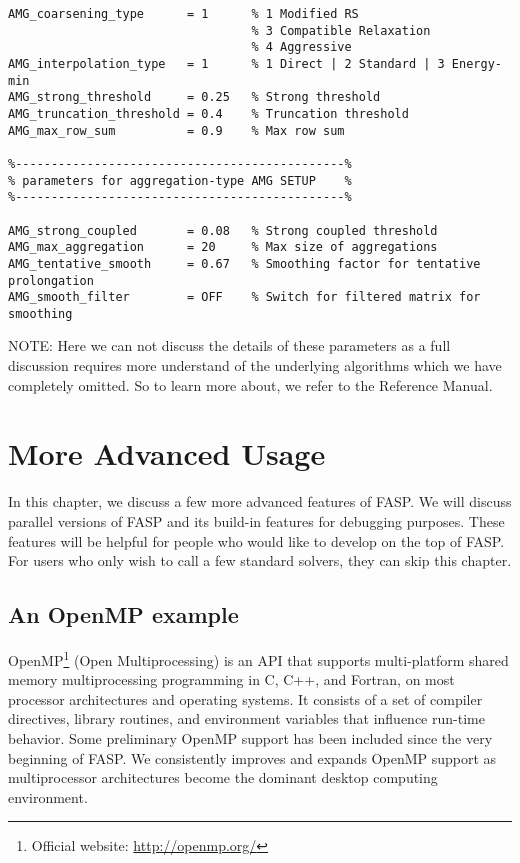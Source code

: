 \documentclass[11pt]{memoir}
\begin{document}
\begin{lstlisting}
AMG_coarsening_type      = 1      % 1 Modified RS
                                  % 3 Compatible Relaxation
                                  % 4 Aggressive 
AMG_interpolation_type   = 1      % 1 Direct | 2 Standard | 3 Energy-min
AMG_strong_threshold     = 0.25   % Strong threshold
AMG_truncation_threshold = 0.4    % Truncation threshold
AMG_max_row_sum          = 0.9    % Max row sum

%----------------------------------------------%
% parameters for aggregation-type AMG SETUP    %
%----------------------------------------------%

AMG_strong_coupled       = 0.08   % Strong coupled threshold
AMG_max_aggregation      = 20     % Max size of aggregations
AMG_tentative_smooth     = 0.67   % Smoothing factor for tentative prolongation
AMG_smooth_filter        = OFF    % Switch for filtered matrix for smoothing
\end{lstlisting}

\begin{snugshade}\noindent
NOTE: Here we can not discuss the details of these parameters as a full discussion requires more understand of the underlying algorithms which we have completely omitted. So to learn more about, we refer to the Reference Manual. 
\end{snugshade}

\chapter{More Advanced Usage}\label{ch:advanced}

In this chapter, we discuss a few more advanced features of FASP. We will discuss parallel versions of FASP and its build-in features for debugging purposes. These features will be helpful for people who would like to develop on the top of FASP. For users who only wish to call a few standard solvers, they can skip this chapter. 

\section{An OpenMP example}\label{sec:mop}

OpenMP\footnote{Official website: \url{http://openmp.org/}} (Open Multiprocessing) is an API that supports multi-platform shared memory multiprocessing programming in C, C++, and Fortran, on most processor architectures and operating systems. It consists of a set of compiler directives, library routines, and environment variables that influence run-time behavior. Some preliminary OpenMP support has been included since the very beginning of FASP. We consistently improves and expands OpenMP support as multiprocessor architectures become the dominant desktop computing environment. 
\end{document}
